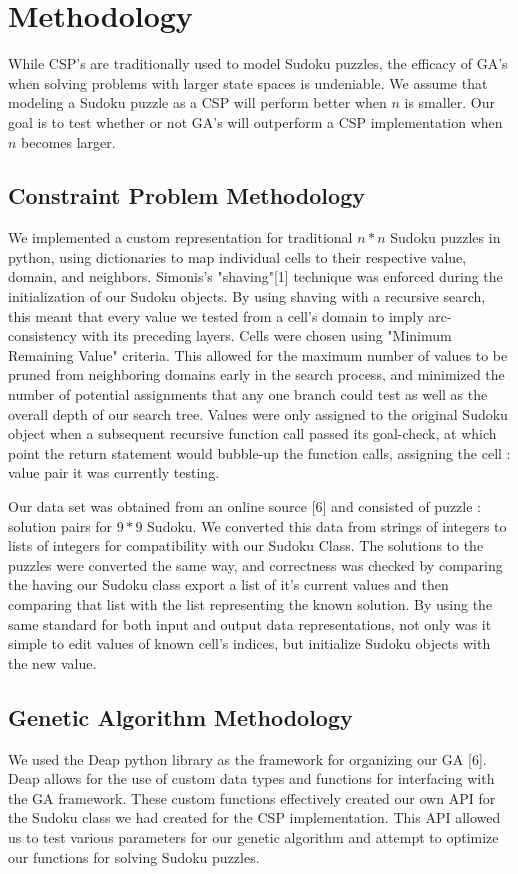 \documentclass[12pt, conference]{IEEEtran}
\begin{document}
\section{Methodology}

While CSP's are traditionally used to model Sudoku puzzles, the efficacy of GA's when solving problems with larger state spaces is undeniable.
We assume that modeling a Sudoku puzzle as a CSP will perform better when $n$ is smaller.
Our goal is to test whether or not GA's will outperform a CSP implementation when $n$ becomes larger.

\subsection{Constraint Problem Methodology}
We implemented a custom representation for traditional ${n*n}$ Sudoku puzzles in python, using dictionaries to map individual cells to their respective value, domain, and neighbors.
Simonis's "shaving"[1] technique was enforced during the initialization of our Sudoku objects.
By using shaving with a recursive search, this meant that every value we tested from a cell's domain to imply arc-consistency with its preceding layers.
Cells were chosen using "Minimum Remaining Value" criteria.
This allowed for the maximum number of values to be pruned from neighboring domains early in the search process, and minimized the number of potential assignments that any one branch could test as well as the overall depth of our search tree.
Values were only assigned to the original Sudoku object when a subsequent recursive function call passed its goal-check, at which point the return statement would bubble-up the function calls, assigning the cell : value pair it was currently testing.

\par
Our data set was obtained from an online source [6] and consisted of puzzle : solution pairs for ${9*9}$ Sudoku.
We converted this data from strings of integers to lists of integers for compatibility with our Sudoku Class.
The solutions to the puzzles were converted the same way, and correctness was checked by comparing the having our Sudoku class export a list of it's current values and then comparing that list with the list representing the known solution.
By using the same standard for both input and output data representations, not only was it simple to edit values of known cell's indices, but initialize Sudoku objects with the new value.

\subsection{Genetic Algorithm Methodology}
We used the Deap python library as the framework for organizing our GA [6].
Deap allows for the use of custom data types and functions for interfacing with the GA framework.
These custom functions effectively created our own API for the Sudoku class we had created for the CSP implementation.
This API allowed us to test various parameters for our genetic algorithm and attempt to optimize our functions for solving Sudoku puzzles.
\end{document}
